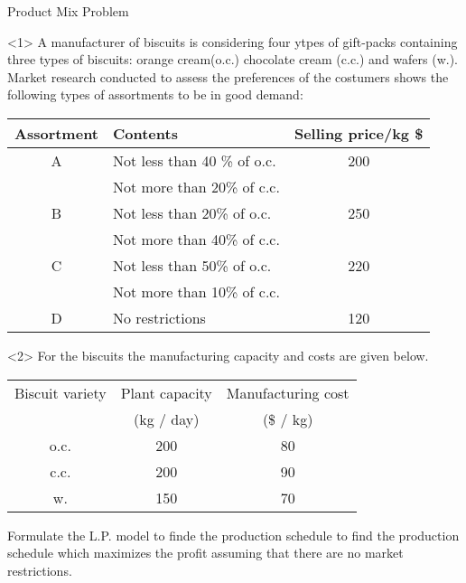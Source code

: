 \begin{frameExample}{Product Mix Problem}{}
  \begin{onlyenv}<1>
      A manufacturer of biscuits is considering four ytpes of gift-packs containing three types of biscuits: orange cream(o.c.) chocolate cream (c.c.) and wafers (w.). Market research conducted to assess the preferences of the costumers shows the following types of assortments to be in good demand:

  {
    \centering
    \begin{tabular}{clc}
      \toprule
      Assortment    & Contents&	Selling price/kg \$\\
      \midrule
A&	Not less than 40 \% of o.c.&	200\\
&	Not more than 20\% of c.c.&	\\
B&	Not less than 20\% of o.c.&	250\\
&	Not more than 40\% of c.c.&	\\
C&	Not less than 50\% of o.c.&	220\\
&	Not more than 10\% of c.c.&	\\
      D&	No restrictions	&120\\
      \bottomrule
    \end{tabular}
    \par
  }
\end{onlyenv}

\begin{onlyenv}<2>
  For the biscuits the manufacturing capacity and costs are given below.
  
  {
    \centering
    \begin{tabular}{ccc}
      \toprule
      Biscuit variety&	Plant capacity&	Manufacturing cost\\
                     &(kg / day)&	(\$ / kg)\\
      \midrule
      o.c.&	200&	80\\
      c.c.	&200&	90\\
      w.	&150&	70\\
      \toprule
    \end{tabular}
    \par
  }

  Formulate the L.P. model to finde the production schedule to find the production schedule which maximizes the profit assuming that there are no market restrictions.
\end{onlyenv}
\end{frameExample}


